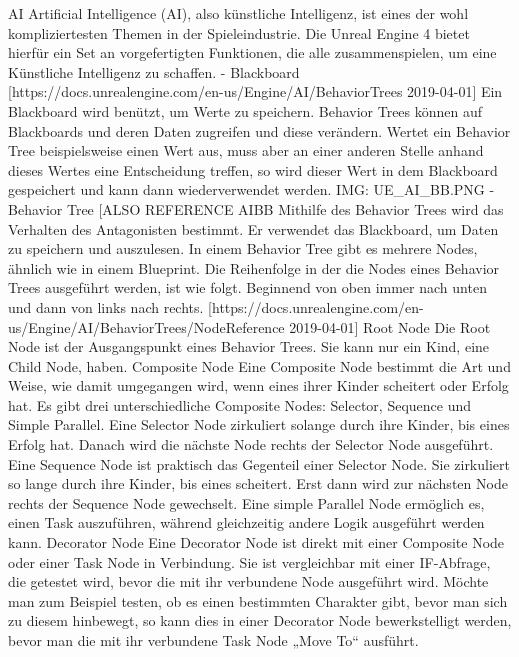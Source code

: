 
AI
Artificial Intelligence (AI), also künstliche Intelligenz, ist eines der wohl kompliziertesten Themen in der Spieleindustrie. Die Unreal Engine 4 bietet hierfür ein Set an vorgefertigten Funktionen, die alle zusammenspielen, um eine Künstliche Intelligenz zu schaffen.
-	Blackboard [https://docs.unrealengine.com/en-us/Engine/AI/BehaviorTrees 2019-04-01]
Ein Blackboard wird benützt, um Werte zu speichern. Behavior Trees können auf Blackboards und deren Daten zugreifen und diese verändern. Wertet ein Behavior Tree beispielsweise einen Wert aus, muss aber an einer anderen Stelle anhand dieses Wertes eine Entscheidung treffen, so wird dieser Wert in dem Blackboard gespeichert und kann dann wiederverwendet werden.
{IMG: UE_AI_BB.PNG}
-	Behavior Tree
[ALSO REFERENCE AIBB
Mithilfe des Behavior Trees wird das Verhalten des Antagonisten bestimmt. Er verwendet das Blackboard, um Daten zu speichern und auszulesen.
In einem Behavior Tree gibt es mehrere Nodes, ähnlich wie in einem Blueprint.
Die Reihenfolge in der die Nodes eines Behavior Trees ausgeführt werden, ist wie folgt. Beginnend von oben immer nach unten und dann von links nach rechts.
[https://docs.unrealengine.com/en-us/Engine/AI/BehaviorTrees/NodeReference 2019-04-01]
Root Node
Die Root Node ist der Ausgangspunkt eines Behavior Trees. Sie kann nur ein Kind, eine Child Node, haben.
Composite Node
Eine Composite Node bestimmt die Art und Weise, wie damit umgegangen wird, wenn eines ihrer Kinder scheitert oder Erfolg hat. Es gibt drei unterschiedliche Composite Nodes: Selector, Sequence und Simple Parallel. Eine Selector Node zirkuliert solange durch ihre Kinder, bis eines Erfolg hat. Danach wird die nächste Node rechts der Selector Node ausgeführt. Eine Sequence Node ist praktisch das Gegenteil einer Selector Node. Sie zirkuliert so lange durch ihre Kinder, bis eines scheitert. Erst dann wird zur nächsten Node rechts der Sequence Node gewechselt. Eine simple Parallel Node ermöglich es, einen Task auszuführen, während gleichzeitig andere Logik ausgeführt werden kann.
Decorator Node
Eine Decorator Node ist direkt mit einer Composite Node oder einer Task Node in Verbindung. Sie ist vergleichbar mit einer IF-Abfrage, die getestet wird, bevor die mit ihr verbundene Node ausgeführt wird. Möchte man zum Beispiel testen, ob es einen bestimmten Charakter gibt, bevor man sich zu diesem hinbewegt, so kann dies in einer Decorator Node bewerkstelligt werden, bevor man die mit ihr verbundene Task Node „Move To“ ausführt.
